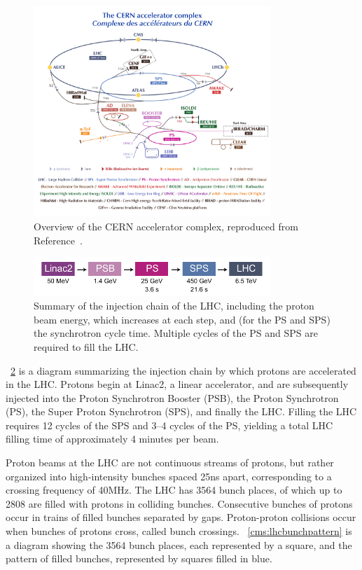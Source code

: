 \begin{figure}[tpb]
  \centering
  \includegraphics[width=0.8\textwidth]{figures/cms/LHCAcceleratorComplex.pdf}
  \caption{Overview of the CERN accelerator complex, reproduced from Reference~\cite{Mobs:2636343}.}
  \label{cms:lhc}
\end{figure}

\begin{figure}[tpb]
  \centering
  \includegraphics[width=0.8\textwidth]{figures/cms/InjectionChain.pdf}
  \caption{Summary of the injection chain of the LHC, including the proton beam energy, which increases at each step, and (for the PS and SPS) the synchrotron cycle time. Multiple cycles of the PS and SPS are required to fill the LHC.}
  \label{cms:injectionchain}
\end{figure}

\Fig~\ref{cms:injectionchain} is a diagram summarizing the injection chain by which protons are accelerated in the LHC.
Protons begin at Linac2, a linear accelerator, and are subsequently injected into the Proton Synchrotron Booster (PSB), the Proton Synchrotron (PS), the Super Proton Synchrotron (SPS), and finally the LHC.
Filling the LHC requires 12 cycles of the SPS and 3--4 cycles of the PS, yielding a total LHC filling time of approximately 4 minutes per beam.

Proton beams at the LHC are not continuous streams of protons, but rather organized into high-intensity bunches spaced 25\unit{ns} apart, corresponding to a crossing frequency of 40\unit{MHz}.
The LHC has 3564 bunch places, of which up to 2808 are filled with protons in colliding bunches.
Consecutive bunches of protons occur in trains of filled bunches separated by gaps.
Proton-proton collisions occur when bunches of protons cross, called bunch crossings.
\Fig~\ref{cms:lhcbunchpattern} is a diagram showing the 3564 bunch places, each represented by a square, and the pattern of filled bunches, represented by squares filled in blue.

